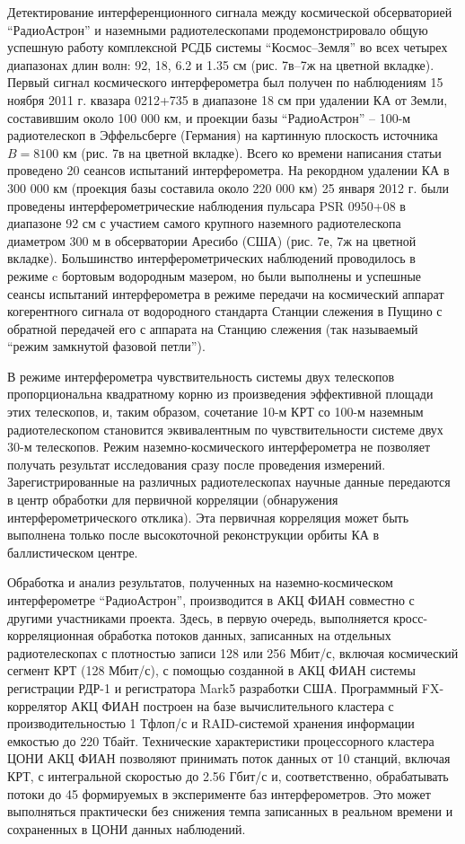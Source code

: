 Детектирование интерференционного сигнала между космической обсерваторией
``РадиоАстрон''
и наземными радиотелескопами продемонстрировало общую успешную работу
комплексной РСДБ системы ``Космос--Земля'' во всех четырех диапазонах длин волн:
92, 18, 6.2 и 1.35 см (рис. 7в--7ж на цветной вкладке).
Первый сигнал космического
интерферометра был получен по наблюдениям 15 ноября 2011 г. квазара 0212+735 в
диапазоне 18 см при удалении КА от Земли, составившим около 100 000 км,
и проекции базы ``РадиоАстрон'' -- 100-м радиотелескоп в Эффельсберге
(Германия) на картинную плоскость источника $B = 8100$ км (рис. 7в на цветной вкладке).
Всего ко времени написания статьи проведено 20 сеансов испытаний интерферометра.
На рекордном удалении КА в 300 000 км (проекция базы составила
около 220 000 км) 25 января 2012 г. были проведены интерферометрические
наблюдения пульсара PSR 0950+08 в диапазоне 92 см с участием самого крупного
наземного радиотелескопа диаметром 300 м в обсерватории Аресибо (США) (рис. 7е, 7ж на цветной
вкладке).
Большинство
интерферометрических наблюдений проводилось в режиме c бортовым водородным
мазером, но были выполнены и успешные сеансы испытаний интерферометра в режиме
передачи на космический аппарат когерентного сигнала от водородного стандарта
Станции слежения в Пущино с обратной передачей его с аппарата на Станцию слежения
(так называемый ``режим замкнутой фазовой петли'').

В режиме интерферометра чувствительность системы двух телескопов
пропорциональна квадратному корню из произведения эффективной
площади этих телескопов, и, таким образом, сочетание 10-м КРТ со 100-м
наземным радиотелескопом становится эквивалентным по чувствительности
системе двух 30-м телескопов. Режим наземно-космического
интерферометра не позволяет
получать результат исследования сразу после проведения измерений.
Зарегистрированные на различных радиотелескопах научные данные
передаются в центр обработки для первичной корреляции (обнаружения
интерферометрического отклика). Эта первичная корреляция может быть
выполнена только после высокоточной реконструкции орбиты КА в
баллистическом центре.

Обработка и анализ результатов, полученных на наземно-космическом интерферометре ``РадиоАстрон'',
производится в АКЦ ФИАН совместно с другими участниками проекта. Здесь, в первую очередь,
выполняется кросс-корреляционная обработка потоков данных, записанных на отдельных радиотелескопах с
плотностью записи 128 или 256 Мбит/с, включая космический сегмент КРТ (128 Мбит/с), с помощью
созданной в АКЦ ФИАН системы регистрации РДР-1 \cite{Belousov_2007} и регистратора Mark5
\cite{Whitney_2003} разработки США. Программный FX-коррелятор АКЦ ФИАН построен на базе
вычислительного кластера с производительностью 1 Тфлоп/с и RAID-системой хранения информации
емкостью до 220 Тбайт. Технические характеристики процессорного кластера ЦОНИ АКЦ ФИАН позволяют
принимать поток данных от 10 станций, включая КРТ, с интегральной скоростью до 2.56 Гбит/с и,
соответственно, обрабатывать потоки до 45 формируемых в эксперименте баз интерферометров. Это может
выполняться практически без снижения темпа записанных в реальном времени и сохраненных в ЦОНИ данных
наблюдений.

